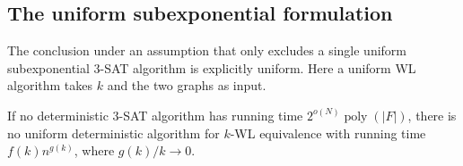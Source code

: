 \subsection{The uniform subexponential formulation}
\label{sec:uniformity}

The conclusion under an assumption that only excludes a single uniform
subexponential \(3\)-SAT algorithm is explicitly uniform.
Here a uniform WL algorithm takes \(k\) and the two graphs as input.

\begin{proposition}
\label{prop:uniform}
If no deterministic \(3\)-SAT algorithm has running time
\(2^{o(N)}\operatorname{poly}(|F|)\), there is no uniform deterministic algorithm for
\(k\)-WL equivalence with running time \(f(k)n^{g(k)}\), where
\(g(k)/k\to0\).
\end{proposition}
